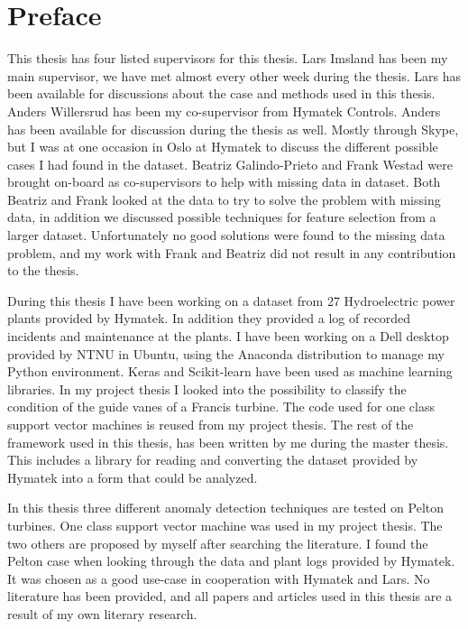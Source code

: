 \chapter*{Preface}

    
    This thesis has four listed supervisors for this thesis. Lars Imsland has been my main supervisor, we have met almost every other week during the thesis. Lars has been available for discussions about the case and methods used in this thesis. Anders Willersrud has been my co-supervisor from Hymatek Controls. Anders has been available for discussion during the thesis as well. Mostly through Skype, but I was at one occasion in Oslo at Hymatek to discuss the different possible cases I had found in the dataset. Beatriz Galindo-Prieto and Frank Westad were brought on-board as co-supervisors to help with missing data in dataset. Both Beatriz and Frank looked at the data to try to solve the problem with missing data, in addition we discussed possible techniques for feature selection from a larger dataset. Unfortunately no good solutions were found to the missing data problem, and my work with Frank and Beatriz did not result in any contribution to the thesis.
    
    During this thesis I have been working on a dataset from 27 Hydroelectric power plants provided by Hymatek. In addition they provided a log of recorded incidents and maintenance at the plants. I have been working on a Dell desktop provided by NTNU in Ubuntu, using the Anaconda distribution to manage my Python environment. Keras and Scikit-learn have been used as machine learning libraries. In my project thesis I looked into the possibility to classify the condition of the guide vanes of a Francis turbine. The code used for one class support vector machines is reused from my project thesis. The rest of the framework used in this thesis, has been written by me during the master thesis. This includes a library for reading and converting the dataset provided by Hymatek into a form that could be analyzed. 
    
    In this thesis three different anomaly detection techniques are tested on Pelton turbines. One class support vector machine was used in my project thesis. The two others are proposed by myself after searching the literature. I found the Pelton case when looking through the data and plant logs provided by Hymatek. It was chosen as a good use-case in cooperation with Hymatek and Lars. No literature has been provided, and all papers and articles used in this thesis are a result of my own literary research.

